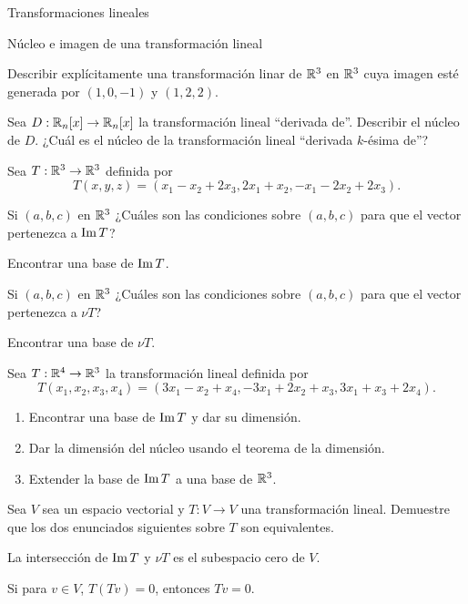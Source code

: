 \begin{chapter}{Transformaciones lineales}
\begin{section}{N\'ucleo e imagen de una transformaci\'on lineal}
\begin{enumex}
            \item Describir explícitamente una transformación linar de $\mathbb R^3$ en $\mathbb R^3$ cuya imagen esté generada por $(1,0,-1)$ y $(1,2,2)$. 

            \item Sea $D: \mathbb R_n[x] \to \mathbb R_n[x]$ la transformación lineal ``derivada de''. Describir el  núcleo de $D$. ¿Cuál es el núcleo de la transformación lineal ``derivada $k$-ésima de''? 
            \item Sea $T: \mathbb R^3 \to \mathbb R^3$  definida por
                $$
                    T(x,y,z) = (x_1-x_2 +2x_3,2x_1 + x_2, -x_1 -2x_2 + 2x_3). 
                $$
                \begin{enumex}
                    \item Si $(a,b,c)$  en $\mathbb R^3$ ¿Cuáles son las condiciones sobre $(a,b,c)$ para que el vector pertenezca a $\operatorname{Im} T$? 
                    \item Encontrar una base de $\operatorname{Im} T$. 
                    \item Si $(a,b,c)$  en $\mathbb R^3$ ¿Cuáles son las condiciones sobre $(a,b,c)$ para que el vector pertenezca a $\nu T$? 
                    \item Encontrar una base de $\nu T$. 
                \end{enumex}
                \item  Sea $T: \mathbb R^4 \to \mathbb R^3$ la transformación lineal  definida por
                $$ T(x_1,x_2,x_3,x_4)  =(3x_1-x_2+x_4,-3x_1 +2x_2+x_3, 3x_1+x_3+2x_4).$$
                \begin{enumerate}
                    \item Encontrar una base de $\operatorname{Im} T$ y dar su dimensión.
                    \item Dar la dimensión del núcleo usando el teorema de la dimensión.
                    \item Extender la base de $\operatorname{Im} T$  a una base de $\mathbb R^3$.
                \end{enumerate}
                
            \item Sea $V$ sea un espacio vectorial y $T: V \to V$ una transformación lineal. Demuestre que los dos enunciados siguientes sobre $T$ son equivalentes.
                \begin{enumex}
                    \item La intersección de $\operatorname{Im} T$ y $\nu T$  es el subespacio cero de $V$.
                    \item Si para $v \in V$, $T (Tv) = 0$, entonces $Tv = 0$.
                \end{enumex}
        \end{enumex}



\end{section}
\end{chapter}
